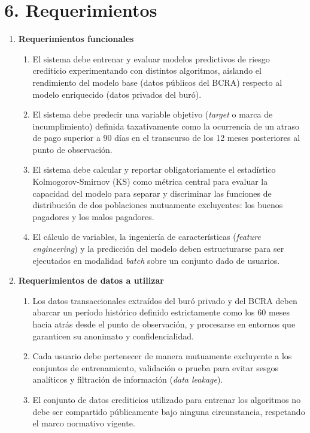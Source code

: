 \documentclass[
11pt, %
codirector, %
]{charter}
\begin{document}
\section{6. Requerimientos}
\label{sec:requerimientos}

\begin{enumerate}

    \item \textbf{Requerimientos funcionales}
    \begin{enumerate}
        \item El sistema debe entrenar y evaluar modelos predictivos de riesgo crediticio experimentando con distintos algoritmos, aislando el rendimiento del modelo base (datos públicos del BCRA) respecto al modelo enriquecido (datos privados del buró).
        \item El sistema debe predecir una variable objetivo (\textit{target} o marca de incumplimiento) definida taxativamente como la ocurrencia de un atraso de pago superior a 90 días en el transcurso de los 12 meses posteriores al punto de observación.
        \item El sistema debe calcular y reportar obligatoriamente el estadístico Kolmogorov-Smirnov (KS) como métrica central para evaluar la capacidad del modelo para separar y discriminar las funciones de distribución de dos poblaciones mutuamente excluyentes: los buenos pagadores y los malos pagadores.
        \item El cálculo de variables, la ingeniería de características (\textit{feature engineering}) y la predicción del modelo deben estructurarse para ser ejecutados en modalidad \textit{batch} sobre un conjunto dado de usuarios.
    \end{enumerate}

    \item \textbf{Requerimientos de datos a utilizar}
    \begin{enumerate}
        \item Los datos transaccionales extraídos del buró privado y del BCRA deben abarcar un período histórico definido estrictamente como los 60 meses hacia atrás desde el punto de observación, y procesarse en entornos que garanticen su anonimato y confidencialidad.
        \item Cada usuario debe pertenecer de manera mutuamente excluyente a los conjuntos de entrenamiento, validación o prueba para evitar sesgos analíticos y filtración de información (\textit{data leakage}).
        \item El conjunto de datos crediticios utilizado para entrenar los algoritmos no debe ser compartido públicamente bajo ninguna circunstancia, respetando el marco normativo vigente.
    \end{enumerate}


\end{enumerate}
\end{document}
